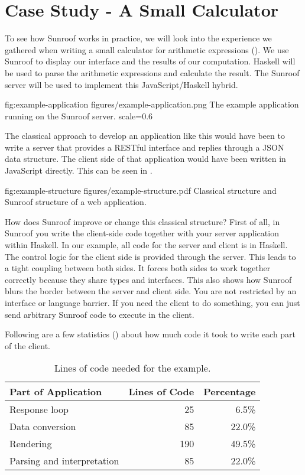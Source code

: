  
\section{Case Study - A Small Calculator}
\label{sec:extended-example}

To see how Sunroof works in practice, we will look into the 
experience we gathered when writing a small calculator
for arithmetic expressions (). 
We use Sunroof to display our interface
and the results of our computation. Haskell will be used to parse the 
arithmetic expressions and calculate the result. The Sunroof server 
will be used to implement this JavaScript/Haskell hybrid.

\FigureS%
{fig:example-application}%
{figures/example-application.png}%
{The example application running on the Sunroof server.}%
{scale=0.6}

The classical approach to develop an application like this would have 
been to write a server that provides a RESTful interface and replies 
through a JSON data structure. 
The client side of that application would have been written in JavaScript
directly.
This can be seen in .

\Figure%
{fig:example-structure}%
{figures/example-structure.pdf}%
{Classical structure and Sunroof structure of a web application.}

How does Sunroof improve or change this classical structure?
First of all, in Sunroof you write the client-side code together with
your server application within Haskell. In our example, all code 
for the server and client is in Haskell. The control logic 
for the client side is provided through the server.
This leads to a tight coupling between both sides. 
It forces both sides to work together
correctly because they share types and interfaces. 
This also shows how Sunroof blurs the border between the server 
and client side. You are not restricted by an interface or language 
barrier. If you need the client to do something, you can just 
send arbitrary Sunroof code to execute in the client.

Following are a few statistics () 
about how much code it took to write each part of the client.

\begin{table}[t]
\begin{center}
\begin{tabular}{l@{\quad}r@{\quad}r}
\hline\rule{0pt}{12pt}%
Part of Application & Lines of Code & Percentage \\[2pt]
\hline\rule{0pt}{12pt}%
Response loop & 25 & 6.5\% \\[2pt]
Data conversion & 85 & 22.0\% \\[2pt]
Rendering & 190 & 49.5\% \\[2pt]
Parsing and interpretation & 85 & 22.0\% \\[2pt]
\hline
\end{tabular}
\end{center}
\caption{Lines of code needed for the example.}
\label{tab:example-statistics}
\vspace{-0.5cm}
\end{table} 

